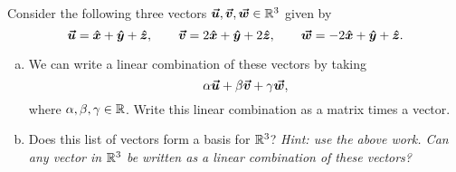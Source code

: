 \documentclass[12pt]{article} %
\begin{document}
\begin{problem}
Consider the following three vectors $\vecu,\vecv,\vecw\in \R^3$ given by
\[
\vecu = \xhat + \yhat +\zhat, \qquad \vecv = 2\xhat + \yhat + 2\zhat, \qquad \vecw = -2\xhat + \yhat +\zhat. 
\]
\begin{enumerate}[(a)]
    \item We can write a linear combination of these vectors by taking
    \[
    \alpha \vecu + \beta \vecv + \gamma \vecw,
    \]
    where $\alpha,\beta,\gamma \in \R$.  Write this linear combination as a matrix times a vector.
    \item Does this list of vectors form a basis for $\R^3$? \emph{Hint: use the above work. Can any vector in $\R^3$ be written as a linear combination of these vectors?}
\end{enumerate}
\end{problem}
\end{document}
